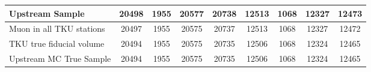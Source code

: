 \begin{landscape}
\begin{table}
\begin{tabular}[pos]{l|cccccccc}
\hline                                            
Upstream Sample                                    &   20498  &    1955  &   20577  &   20738  &   12513  &    1068  &   12327  &   12473  \\
\hline                                            
Muon in all TKU stations                           &   20497  &    1955  &   20575  &   20737  &   12513  &    1068  &   12327  &   12472  \\
TKU true fiducial volume                           &   20494  &    1955  &   20575  &   20735  &   12506  &    1068  &   12324  &   12465  \\
\hline                                            
Upstream MC True Sample                            &   20494  &    1955  &   20575  &   20735  &   12506  &    1068  &   12324  &   12465  \\
\hline                                            

\end{tabular}
\end{table}
\end{landscape}

